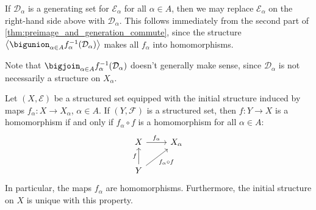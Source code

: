 \documentclass[article, a4paper, 11pt, oneside]{memoir}
\numberwithin{equation}{chapter}
\newcommand{\calE}{\mathcal{E}}
\newcommand{\calD}{\mathcal{D}}
\newcommand{\calF}{\mathcal{F}}
\DeclarePairedDelimiter{\gen}{\langle}{\rangle} %
\begin{document}
\begin{remark}
    \label{rem:initial_structure_generating_set}
    If $\calD_\alpha$ is a generating set for $\calE_\alpha$ for all $\alpha \in A$, then we may replace $\calE_\alpha$ on the right-hand side above with $\calD_\alpha$. This follows immediately from the second part of \cref{thm:preimage_and_generation_commute}, since the structure $\gen[\big]{ \bigunion_{\alpha \in A} f_\alpha^{-1}(\calD_\alpha) }$ makes all $f_\alpha$ into homomorphisms.

    Note that $\bigjoin_{\alpha \in A} f_\alpha^{-1}(\calD_\alpha)$ doesn't generally make sense, since $\calD_\alpha$ is not necessarily a structure on $X_\alpha$.
\end{remark}


\begin{theorem}
    Let $(X,\calE)$ be a structured set equipped with the initial structure induced by maps $f_\alpha \colon X \to X_\alpha$,  $\alpha \in A$. If $(Y,\calF)$ is a structured set, then $f \colon Y \to X$ is a homomorphism if and only if $f_\alpha \circ f$ is a homomorphism for all $\alpha \in A$:
    \begin{equation*}
        \begin{tikzcd}
            X
                \ar[r, "f_\alpha"]
            & X_\alpha \\
            Y
                \ar[u, "f"]
                \ar[ur, "f_\alpha \circ f", swap]
        \end{tikzcd}
    \end{equation*}
    In particular, the maps $f_\alpha$ are homomorphisms. Furthermore, the initial structure on $X$ is unique with this property.
\end{theorem}
\end{document}

